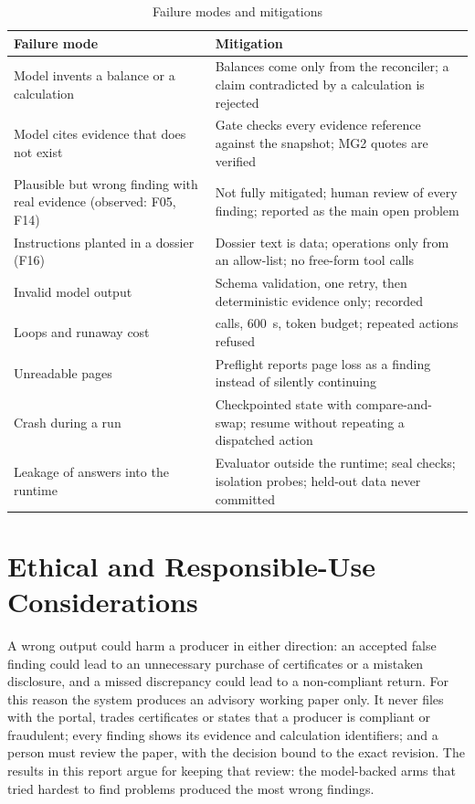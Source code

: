 \begin{table}[htbp]
\centering
\caption{Failure modes and mitigations}
\label{tab:failures}
\small
\begin{tabularx}{\linewidth}{@{}>{\raggedright\arraybackslash}X >{\raggedright\arraybackslash}X@{}}
\toprule
\textbf{Failure mode} & \textbf{Mitigation} \\ \midrule
Model invents a balance or a calculation & Balances come only from the reconciler; a claim contradicted by a calculation is rejected \\
Model cites evidence that does not exist & Gate checks every evidence reference against the snapshot; MG2 quotes are verified \\
Plausible but wrong finding with real evidence (observed: F05, F14) & Not fully mitigated; human review of every finding; reported as the main open problem \\
Instructions planted in a dossier (F16) & Dossier text is data; operations only from an allow-list; no free-form tool calls \\
Invalid model output & Schema validation, one retry, then deterministic evidence only; recorded \\
Loops and runaway cost & 12 calls, 600~s, token budget; repeated actions refused \\
Unreadable pages & Preflight reports page loss as a finding instead of silently continuing \\
Crash during a run & Checkpointed state with compare-and-swap; resume without repeating a dispatched action \\
Leakage of answers into the runtime & Evaluator outside the runtime; seal checks; isolation probes; held-out data never committed \\
\bottomrule
\end{tabularx}
\end{table}

\section{Ethical and Responsible-Use Considerations}
A wrong output could harm a producer in either direction: an accepted false finding could lead to an
unnecessary purchase of certificates or a mistaken disclosure, and a missed discrepancy could lead to
a non-compliant return. For this reason the system produces an advisory working paper only. It never
files with the portal, trades certificates or states that a producer is compliant or fraudulent; every
finding shows its evidence and calculation identifiers; and a person must review the paper, with the
decision bound to the exact revision. The results in this report argue for keeping that review: the
model-backed arms that tried hardest to find problems produced the most wrong findings.

